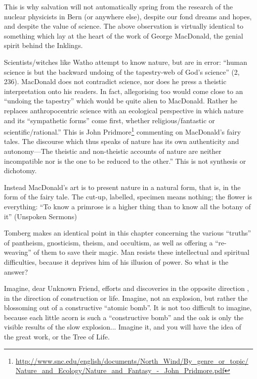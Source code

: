 This is why salvation will not automatically spring from the research of the nuclear physicists in Bern (or anywhere else), despite our fond dreams and hopes, and despite the value of science. The above observation is virtually identical to something which lay at the heart of the work of George MacDonald, the genial spirit behind the Inklings.

\begin{quotationx}
Scientists/witches like Watho attempt to know nature, but are in error: ``human science is but the backward undoing of the tapestry-web of God's science'' (2, 236). MacDonald does not contradict science, nor does he press a theistic interpretation onto his readers. In fact, allegorising too would come close to an ``undoing the tapestry'' which would be quite alien to MacDonald. Rather he replaces anthropocentric science with an ecological perspective in which nature and its ``sympathetic forms'' come first, whether religious/fantastic or scientific/rational.'' This is John Pridmore\footnote{\url{http://www.snc.edu/english/documents/North\_Wind/By\_genre\_or\_topic/Nature\_and\_Ecology/Nature\_and\_Fantasy\_-\_John\_Pridmore.pdf}} commenting on MacDonald's fairy tales. The discourse which thus speaks of nature has its own authenticity and autonomy---The theistic and non-theistic accounts of nature are neither incompatible nor is the one to be reduced to the other.'' This is not synthesis or dichotomy.

Instead MacDonald's art is to present nature in a natural form, that is, in the form of the fairy tale. The cut-up, labelled, specimen means nothing; the flower is everything: ``To know a primrose is a higher thing than to know all the botany of it'' (Unspoken Sermons)
\end{quotationx}


Tomberg makes an identical point in this chapter concerning the various ``truths'' of pantheism, gnosticism, theism, and occultism, as well as offering a ``re-weaving'' of them to save their magic. Man resists these intellectual and spiritual difficulties, because it deprives him of his illusion of power. So what is the answer?

\begin{quotex}
Imagine, dear Unknown Friend, efforts and discoveries in the opposite direction , in the direction of construction or life. Imagine, not an explosion, but rather the blossoming out of a constructive ``atomic bomb''. It is not too difficult to imagine, because each little acorn is such a ``constructive bomb'' and the oak is only the visible results of the slow explosion... Imagine it, and you will have the idea of the great work, or the Tree of Life.
\end{quotex}


